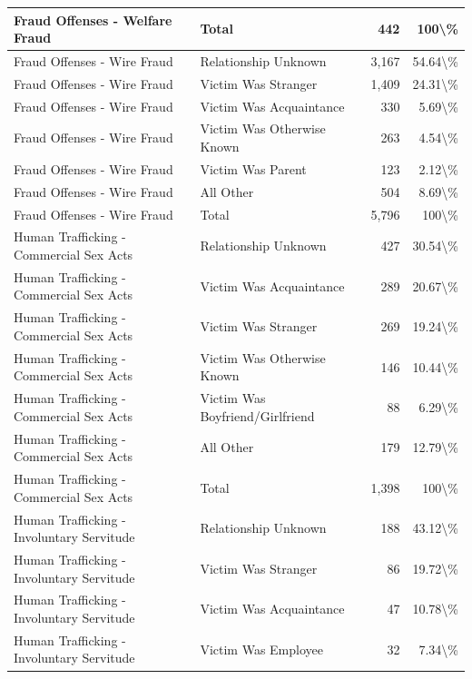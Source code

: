 \documentclass[
]{krantz}
\begin{document}
\begin{longtable}[t]{l|l|r|r}
\hline
Fraud Offenses - Welfare Fraud & Total & 442 & 100\textbackslash{}\%\\
\hline
Fraud Offenses - Wire Fraud & Relationship Unknown & 3,167 & 54.64\textbackslash{}\%\\
\hline
Fraud Offenses - Wire Fraud & Victim Was Stranger & 1,409 & 24.31\textbackslash{}\%\\
\hline
Fraud Offenses - Wire Fraud & Victim Was Acquaintance & 330 & 5.69\textbackslash{}\%\\
\hline
Fraud Offenses - Wire Fraud & Victim Was Otherwise Known & 263 & 4.54\textbackslash{}\%\\
\hline
Fraud Offenses - Wire Fraud & Victim Was Parent & 123 & 2.12\textbackslash{}\%\\
\hline
Fraud Offenses - Wire Fraud & All Other & 504 & 8.69\textbackslash{}\%\\
\hline
Fraud Offenses - Wire Fraud & Total & 5,796 & 100\textbackslash{}\%\\
\hline
Human Trafficking - Commercial Sex Acts & Relationship Unknown & 427 & 30.54\textbackslash{}\%\\
\hline
Human Trafficking - Commercial Sex Acts & Victim Was Acquaintance & 289 & 20.67\textbackslash{}\%\\
\hline
Human Trafficking - Commercial Sex Acts & Victim Was Stranger & 269 & 19.24\textbackslash{}\%\\
\hline
Human Trafficking - Commercial Sex Acts & Victim Was Otherwise Known & 146 & 10.44\textbackslash{}\%\\
\hline
Human Trafficking - Commercial Sex Acts & Victim Was Boyfriend/Girlfriend & 88 & 6.29\textbackslash{}\%\\
\hline
Human Trafficking - Commercial Sex Acts & All Other & 179 & 12.79\textbackslash{}\%\\
\hline
Human Trafficking - Commercial Sex Acts & Total & 1,398 & 100\textbackslash{}\%\\
\hline
Human Trafficking - Involuntary Servitude & Relationship Unknown & 188 & 43.12\textbackslash{}\%\\
\hline
Human Trafficking - Involuntary Servitude & Victim Was Stranger & 86 & 19.72\textbackslash{}\%\\
\hline
Human Trafficking - Involuntary Servitude & Victim Was Acquaintance & 47 & 10.78\textbackslash{}\%\\
\hline
Human Trafficking - Involuntary Servitude & Victim Was Employee & 32 & 7.34\textbackslash{}\%\\

\end{longtable}
\end{document}
